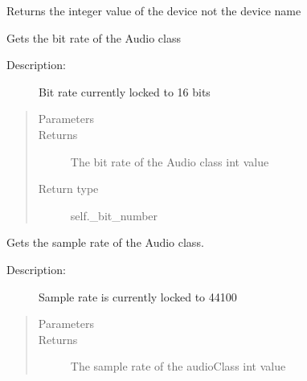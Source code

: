 \documentclass[letterpaper,10pt,english,openany,oneside]{sphinxmanual}
\begin{document}
\begin{fulllineitems}
\begin{fulllineitems}
\sphinxAtStartPar
Returns the integer value of the device not the device name

\end{fulllineitems}



\begin{fulllineitems}
\sphinxAtStartPar
Gets the bit rate of the Audio class
\begin{description}
\item[{Description:}] \leavevmode
\sphinxAtStartPar
Bit rate currently locked to 16 bits

\end{description}
\begin{quote}\begin{description}
\item[{Parameters}] \leavevmode
\sphinxAtStartPar
{} \textendash{} 

\item[{Returns}] \leavevmode
\sphinxAtStartPar
The bit rate of the Audio class \sphinxhyphen{} int value

\item[{Return type}] \leavevmode
\sphinxAtStartPar
self.\_bit\_number

\end{description}\end{quote}

\end{fulllineitems}



\begin{fulllineitems}
\sphinxAtStartPar
Gets the sample rate of the Audio class.
\begin{description}
\item[{Description:}] \leavevmode
\sphinxAtStartPar
Sample rate is currently locked to 44100

\end{description}
\begin{quote}\begin{description}
\item[{Parameters}] \leavevmode
\sphinxAtStartPar
{} \textendash{} 

\item[{Returns}] \leavevmode
\sphinxAtStartPar
The sample rate of the audioClass \sphinxhyphen{} int value


\end{description}
\end{quote}
\end{fulllineitems}
\end{fulllineitems}
\end{document}
